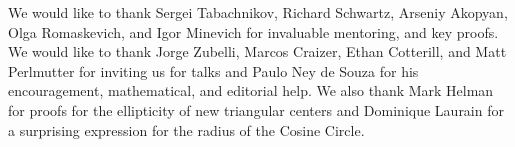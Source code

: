 \begin{acknowledgements}
We would like to thank Sergei Tabachnikov, Richard Schwartz, Arseniy Akopyan, Olga Romaskevich, and Igor Minevich for invaluable mentoring, and key proofs. We would like to thank Jorge Zubelli, Marcos Craizer, Ethan Cotterill, and Matt Perlmutter for inviting us for talks and Paulo Ney de Souza for his encouragement, mathematical, and editorial help. We also thank Mark Helman for proofs for the ellipticity of new triangular centers and Dominique Laurain for a surprising expression for the radius of the Cosine Circle.
\end{acknowledgements}